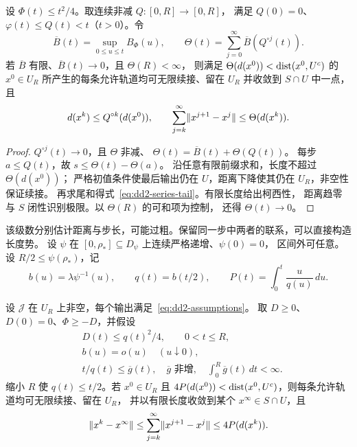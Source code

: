 \begin{theorem}[比较级数条件]\label{thm:dd2-series}
设 $\Phi(t)\le t^2/4$。取连续非减 $Q:[0,R]\to[0,R]$，
满足 $Q(0)=0$、$\varphi(t)\le Q(t)<t$（$t>0$）。令
\begin{equation}\label{eq:dd2-series}
 \overline B(t)=\sup_{0\le u\le t}B_\Phi(u),\qquad
 \Theta(t)=\sum_{j=0}^\infty\overline B(Q^{\circ j}(t)).
\end{equation}
若 $\overline B$ 有限、$\overline B(t)\to0$，且 $\Theta(R)<\infty$，
则满足 $\Theta(d(x^0))<\operatorname{dist}(x^0,U^c)$ 的 $x^0\in U_R$
所产生的每条允许轨道均可无限续接、留在 $U_R$ 并收敛到 $S\cap U$ 中一点，且
\begin{equation}\label{eq:dd2-series-tail}
 d(x^k)\le Q^{\circ k}(d(x^0)),\qquad
 \sum_{j=k}^\infty\lVert x^{j+1}-x^j\rVert\le\Theta(d(x^k)).
\end{equation}
\end{theorem}

\begin{proof}
$Q^{\circ j}(t)\to0$，且 $\Theta$ 非减、
$\Theta(t)=\overline B(t)+\Theta(Q(t))$。
每步 $a\le Q(t)$，故 $s\le\Theta(t)-\Theta(a)$。
沿任意有限前缀求和，长度不超过 $\Theta(d(x^0))$；
严格初值条件使最后输出仍在 $U$，距离下降使其仍在 $U_R$，非空性保证续接。
再求尾和得式~\eqref{eq:dd2-series-tail}。有限长度给出柯西性，
距离趋零与 $S$ 闭性识别极限。以 $\Theta(R)$ 的可和项为控制，
还得 $\Theta(t)\to0$。
\end{proof}

该级数分别估计距离与步长，可能过粗。保留同一步中两者的联系，可以直接构造长度势。
设 $\psi$ 在 $[0,\rho_*]\subseteq D_\psi$ 上连续严格递增、$\psi(0)=0$，
区间外可任意。设 $R/2\le\psi(\rho_*)$，记
\begin{equation}\label{eq:dd2-q}
 b(u)=\lambda\psi^{-1}(u),\qquad q(t)=b(t/2),\qquad
 P(t)=\int_0^t\frac{u}{q(u)}\,du.
\end{equation}

\begin{theorem}[耦合长度条件]\label{thm:dd2-length}
设 $\mathcal J$ 在 $U_R$ 上非空，每个输出满足~\eqref{eq:dd2-assumptions}。
取 $D\ge0$、$D(0)=0$、$\Phi\ge-D$，并假设
\begin{align}
 &D(t)\le q(t)^2/4,\qquad 0<t\le R, \tag{F1}\label{eq:dd2-F1}\\
 &b(u)=o(u)\quad(u\downarrow0), \tag{F2}\label{eq:dd2-F2}\\
 &t/q(t)\le\overline g(t),\quad \overline g\text{ 非增},\quad
   \int_0^R\overline g(t)\,dt<\infty. \tag{F3}\label{eq:dd2-F3}
\end{align}
缩小 $R$ 使 $q(t)\le t/2$。若 $x^0\in U_R$ 且
$4P(d(x^0))<\operatorname{dist}(x^0,U^c)$，则每条允许轨道均可无限续接、留在 $U_R$，
并以有限长度收敛到某个 $x^\infty\in S\cap U$，且
\begin{equation}\label{eq:dd2-potential-tail}
 \lVert x^k-x^\infty\rVert\le\sum_{j=k}^\infty\lVert x^{j+1}-x^j\rVert
 \le4P(d(x^k)).
\end{equation}
\end{theorem}

